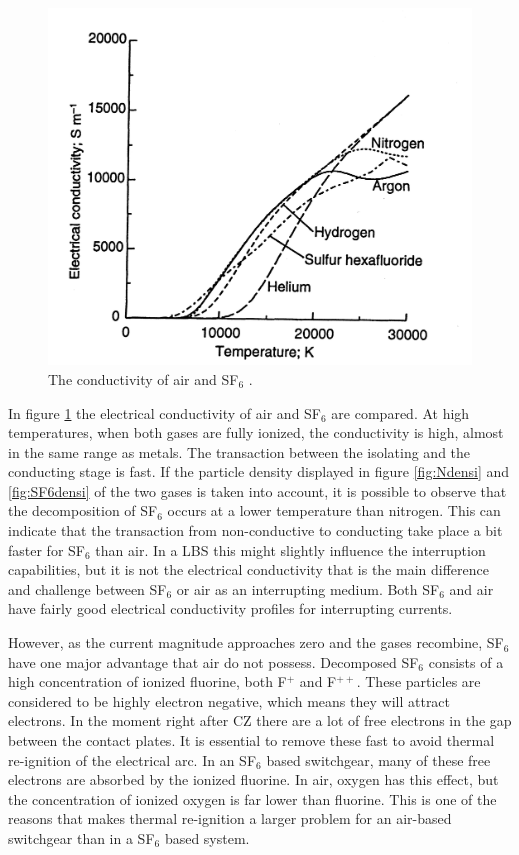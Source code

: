 \documentclass[10pt,a4paper,twoside]{article}
\begin{document}
\begin{figure}[H]
\centering
\includegraphics[scale=1]{Bilder/Discussion/conductSF6AndAIR.png}
\caption{The conductivity of air and SF${_6}$ \cite{bib:THFD}.} \label{fig:AirandSF6ConComp}
\end{figure}

In figure \ref{fig:AirandSF6ConComp} the electrical conductivity of air and SF$_6$ are compared. At high temperatures, when both gases are fully ionized, the conductivity is high, almost in the same range as metals. The transaction between the isolating and the conducting stage is fast. If the particle density displayed in figure \ref{fig:Ndensi} and \ref{fig:SF6densi} of the two gases is taken into account, it is possible to observe that the decomposition of SF$_6$ occurs at a lower temperature than nitrogen. This can indicate that the transaction from non-conductive to conducting take place a bit faster for SF$_6$ than air. In a LBS this might slightly influence the interruption capabilities, but it is not the electrical conductivity that is the main difference and challenge between SF$_6$ or air as an interrupting medium. Both SF$_6$ and air have fairly good electrical conductivity profiles for interrupting currents.

However, as the current magnitude approaches zero and the gases recombine, SF$_6$ have one major advantage that air do not possess. Decomposed SF$_6$ consists of a high concentration of ionized fluorine, both F$^{+}$ and F$^{++}$. These particles are considered to be highly electron negative, which means they will attract electrons. In the moment right after CZ there are a lot of free electrons in the gap between the contact plates. It is essential to remove these fast to avoid thermal re-ignition of the electrical arc. In an SF$_6$ based switchgear, many of these free electrons are absorbed by the ionized fluorine. In air, oxygen has this effect, but the concentration of ionized oxygen is far lower than fluorine. This is one of the reasons that makes thermal re-ignition a larger problem for an air-based switchgear than in a SF$_6$ based system.
\end{document}
